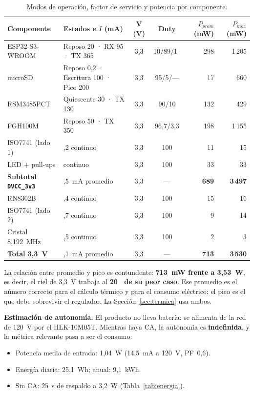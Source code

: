 \documentclass[11pt,a4paper]{article}
\newcommand{\pct}{\text{\char37}}
\begin{document}
\begin{table}[H]
\centering
\caption{Modos de operación, factor de servicio y potencia por componente.}
\label{tab:perfil}
\small
\begin{tabularx}{\textwidth}{@{}>{\raggedright\arraybackslash}p{2.9cm}>{\raggedright\arraybackslash}X c c r r@{}}
\toprule
\textbf{Componente} & \textbf{Estados e $I$ (mA)} & \textbf{V (V)} & \textbf{Duty} & \textbf{$P_{prom}$ (mW)} & \textbf{$P_{max}$ (mW)} \\
\midrule
ESP32-S3-WROOM & Reposo 20 · RX 95 · TX 365 & 3,3 & 10/89/1~\pct & 298 & 1\,205 \\
microSD & Reposo 0,2 · Escritura 100 · Pico 200 & 3,3 & 95/5/--- & 17 & 660 \\
RSM3485PCT & Quiescente 30 · TX 130 & 3,3 & 90/10 & 132 & 429 \\
FGH100M & Reposo 50 · TX 350 & 3,3 & 96,7/3,3 & 198 & 1\,155 \\
ISO7741 (lado 1) & 3,2 continuo & 3,3 & 100 & 11 & 15 \\
LED + pull-ups & 10 continuo & 3,3 & 100 & 33 & 33 \\
\midrule
\textbf{Subtotal \texttt{DVCC\_3v3}} & 208,5~mA promedio & 3,3 & --- & \textbf{689} & \textbf{3\,497} \\
RN8302B & 4,4 continuo & 3,3 & 100 & 15 & 16 \\
ISO7741 (lado 2) & 2,7 continuo & 3,3 & 100 & 9 & 14 \\
Cristal 8,192~MHz & 0,5 continuo & 3,3 & 100 & 2 & 3 \\
\midrule
\textbf{Total 3,3~V} & 216,1~mA promedio & 3,3 & --- & \textbf{713} & \textbf{3\,530} \\
\bottomrule
\end{tabularx}
\end{table}

\noindent La relación entre promedio y pico es contundente: \textbf{713~mW
frente a 3,53~W}, es decir, el riel de 3,3~V trabaja al \textbf{20~\pct{} de su
peor caso}. Ese promedio es el número correcto para el cálculo térmico y para el
consumo eléctrico; el pico es el que debe sobrevivir el regulador. La
Sección~\ref{sec:termica} usa ambos.

\noindent\textbf{Estimación de autonomía.} El producto no lleva batería: se
alimenta de la red de 120~V por el HLK-10M05T. Mientras haya CA, la autonomía es
\textbf{indefinida}, y la métrica relevante pasa a ser el consumo:

\begin{itemize}
  \item Potencia media de entrada: 1,04~W (14,5~mA a 120~V, PF~0,6).
  \item Energía diaria: 25,1~Wh; anual: 9,1~kWh.
  \item Sin CA: 25~s de respaldo a 3,2~W (Tabla~\ref{tab:energia}).
\end{itemize}
\end{document}
